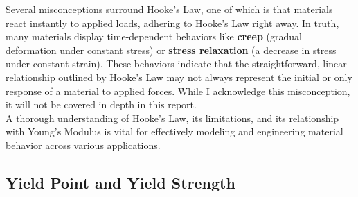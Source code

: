 \documentclass{article}
\begin{document}
{Several misconceptions surround Hooke's Law, one of which is that materials react instantly to applied loads, adhering to Hooke's Law right away. In truth, many materials display time-dependent behaviors like \textbf{creep} (gradual deformation under constant stress) or \textbf{stress relaxation} (a decrease in stress under constant strain). These behaviors indicate that the straightforward, linear relationship outlined by Hooke's Law may not always represent the initial or only response of a material to applied forces. While I acknowledge this misconception, it will not be covered in depth in this report. \\[8pt]
A thorough understanding of Hooke's Law, its limitations, and its relationship with Young's Modulus is vital for effectively modeling and engineering material behavior across various applications.    
    
    \newpage
\subsection{Yield Point and Yield Strength}

}
\end{document}
